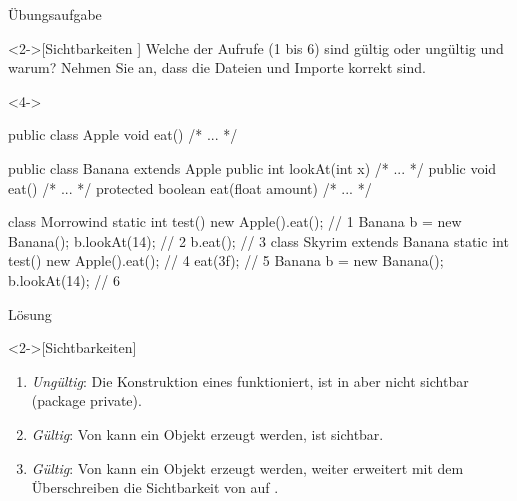 \ifull
\begin{frame}[c,fragile]{Übungsaufgabe}
    \begin{exercise}<2->[Sichtbarkeiten ]
        Welche der Aufrufe (1 bis 6) sind gültig oder ungültig und warum? Nehmen Sie an, dass die Dateien und Importe korrekt sind.\medskip\par
\begin{onlyenv}<4->
\begin{minipage}{.7\linewidth}
%
\begin{plainjava}[morekeywords={[3]{Apple,Banana}},belowskip=4.5pt]
public class Apple { void eat() { /* ... */ } }

public class Banana extends Apple {
  public int lookAt(int x) { /* ... */ }
  public void eat() { /* ... */ }
  protected boolean eat(float amount) { /* ... */ }
}
\end{plainjava}
\begin{plainjava}[multicols=2,morekeywords={[3]{Apple,Banana,Skyrim,Morrowind}},aboveskip=4.5pt,belowskip=2pt]
class Morrowind {
  static int test() {
    new Apple().eat(); // 1
    Banana b = new Banana();
    b.lookAt(14); // 2
    b.eat(); // 3
}}
class Skyrim extends Banana {
  static int test() {
    new Apple().eat(); // 4
    eat(3f); // 5
    Banana b = new Banana();
    b.lookAt(14); // 6
}}
\end{plainjava}
\end{minipage}%
\end{onlyenv}%
\hfill{}
    \end{exercise}
\end{frame}

\begin{frame}[c]{Lösung}
    \begin{solve}<2->[Sichtbarkeiten]
       \begin{enumerate}[<+(1)->]
            \item \emph{Ungültig}: Die Konstruktion eines  funktioniert,  ist in  aber nicht sichtbar (package private).
            \item \emph{Gültig}: Von  kann ein Objekt erzeugt werden,  ist  sichtbar.
            \item \emph{Gültig}: Von  kann ein Objekt erzeugt werden, weiter erweitert  mit dem Überschreiben die Sichtbarkeit von  auf .
       \end{enumerate}
    \end{solve}
\end{frame}

